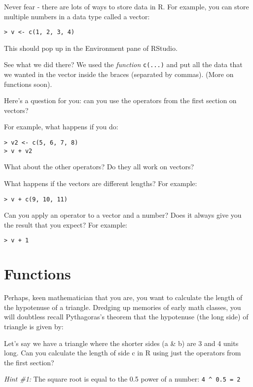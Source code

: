 \documentclass[
]{book}
\begin{document}
Never fear - there are lots of ways to store data in R. For example, you can store multiple numbers in a data type called a vector:

\begin{verbatim}
> v <- c(1, 2, 3, 4)
\end{verbatim}

This should pop up in the Environment pane of RStudio.

See what we did there? We used the \emph{function} \texttt{c(...)} and put all the data that we wanted in the vector inside the braces (separated by commas). (More on functions soon).

Here's a question for you: can you use the operators from the first section on vectors?

For example, what happens if you do:

\begin{verbatim}
> v2 <- c(5, 6, 7, 8)
> v + v2
\end{verbatim}

What about the other operators? Do they all work on vectors?

What happens if the vectors are different lengths? For example:

\begin{verbatim}
> v + c(9, 10, 11)
\end{verbatim}

Can you apply an operator to a vector and a number? Does it always give you the result that you expect? For example:

\begin{verbatim}
> v + 1
\end{verbatim}

\hypertarget{functions}{%
\section{Functions}\label{functions}}

Perhaps, keen mathematician that you are, you want to calculate the length of the hypotenuse of a triangle. Dredging up memories of early math classes, you will doubtless recall Pythagoras's theorem that the hypotenuse (the long side) of triangle is given by:

Let's say we have a triangle where the shorter sides (a \& b) are 3 and 4 units long. Can you calculate the length of side c in R using just the operators from the first section?

\emph{Hint \#1:} The square root is equal to the 0.5 power of a number: \texttt{4\ \^{}\ 0.5\ =\ 2}
\end{document}
